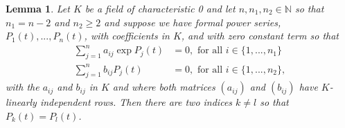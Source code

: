 \documentclass{article}
\newtheorem{lemma}{Lemma}[section]
\newcommand{\mbb}[1]{\mathbb{#1}}
\numberwithin{equation}{section}
\begin{document}
\begin{lemma} \label{lem: Two power series are equal}
    Let $K$ be a field of characteristic 0 and let $n,n_1,n_2 \in \mbb N$ so that $n_1 = n - 2$ and $n_2 \geq 2$ and suppose we have formal power series, $P_1(t), ..., P_n(t)$, with coefficients in $K$, and with zero constant term so that
    \begin{align*}
        \sum_{j = 1}^n a_{ij} \exp P_j(t) & = 0, \text{ for all } i \in \{1, ..., n_1\}  \\
        \sum_{j = 1}^n b_{ij} P_j(t)      & = 0, \text{ for all } i \in \{1, ..., n_2\},
    \end{align*}
    with the $a_{ij}$ and $b_{ij}$ in $K$ and where both matrices $(a_{ij})$ and $(b_{ij})$ have $K$-linearly independent rows. Then there are two indices $k \neq l$ so that $P_k(t) = P_l(t)$.
\end{lemma}
\end{document}
